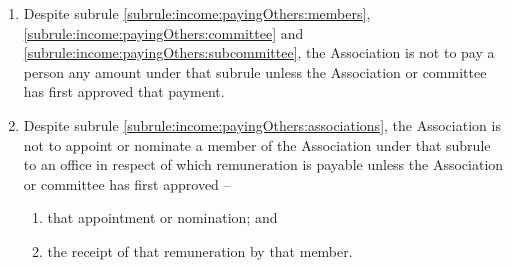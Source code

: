 \begin{enumerate}
	\item Despite subrule \ref{subrule:income:payingOthers:members}, \ref{subrule:income:payingOthers:committee} and \ref{subrule:income:payingOthers:subcommittee}, the Association is not to pay a person any amount under that subrule unless the Association or committee has first approved that payment.

	\item Despite subrule \ref{subrule:income:payingOthers:associations}, the Association is not to appoint or nominate a member of the Association under that subrule to an office in respect of which remuneration is payable unless the Association or committee has first approved --
	\begin{enumerate}
		\item that appointment or nomination; and
		\item the receipt of that remuneration by that member.
	\end{enumerate}

\end{enumerate}